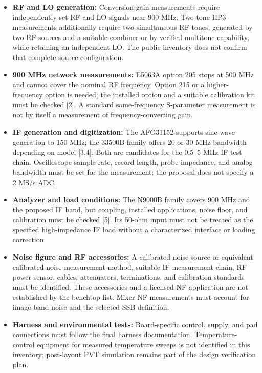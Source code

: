 \documentclass[10pt,letterpaper]{article}
\begin{document}
\begin{itemize}
    \item \textbf{RF and LO generation:}
    Conversion-gain measurements require independently set RF and LO signals near 900 MHz.
    Two-tone IIP3 measurements additionally require two simultaneous RF tones, generated by two RF sources and a suitable combiner or by verified multitone capability, while retaining an independent LO.
    The public inventory does not confirm that complete source configuration.

    \item \textbf{900 MHz network measurements:}
    E5063A option 205 stops at 500 MHz and cannot cover the nominal RF frequency.
    Option 215 or a higher-frequency option is needed; the installed option and a suitable calibration kit must be checked [2].
    A standard same-frequency S-parameter measurement is not by itself a measurement of frequency-converting gain.

    \item \textbf{IF generation and digitization:}
    The AFG31152 supports sine-wave generation to 150 MHz; the 33500B family offers 20 or 30 MHz bandwidth depending on model [3,4].
    Both are candidates for the 0.5--5 MHz IF test chain.
    Oscilloscope sample rate, record length, probe impedance, and analog bandwidth must be set for the measurement; the proposal does not specify a 2 MS/s ADC.

    \item \textbf{Analyzer and load conditions:}
    The N9000B family covers 900 MHz and the proposed IF band, but coupling, installed applications, noise floor, and calibration must be checked [5].
    Its 50-ohm input must not be treated as the specified high-impedance IF load without a characterized interface or loading correction.

    \item \textbf{Noise figure and RF accessories:}
    A calibrated noise source or equivalent calibrated noise-measurement method, suitable IF measurement chain, RF power sensor, cables, attenuators, terminations, and calibration standards must be identified.
    These accessories and a licensed NF application are not established by the benchtop list.
    Mixer NF measurements must account for image-band noise and the selected SSB definition.

    \item \textbf{Harness and environmental tests:}
    Board-specific control, supply, and pad connections must follow the final harness documentation.
    Temperature-control equipment for measured temperature sweeps is not identified in this inventory; post-layout PVT simulation remains part of the design verification plan.
\end{itemize}
\end{document}
